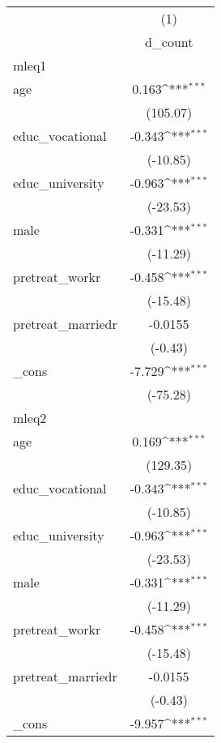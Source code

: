 {
\def\sym#1{\ifmmode^{#1}\else\(^{#1}\)\fi}
\begin{tabular}{l*{1}{c}}
\hline\hline
            &\multicolumn{1}{c}{(1)}\\
            &\multicolumn{1}{c}{d\_count}\\
\hline
mleq1       &                     \\
age         &       0.163\sym{***}\\
            &    (105.07)         \\
[1em]
educ\_vocational&      -0.343\sym{***}\\
            &    (-10.85)         \\
[1em]
educ\_university&      -0.963\sym{***}\\
            &    (-23.53)         \\
[1em]
male        &      -0.331\sym{***}\\
            &    (-11.29)         \\
[1em]
pretreat\_workr&      -0.458\sym{***}\\
            &    (-15.48)         \\
[1em]
pretreat\_marriedr&     -0.0155         \\
            &     (-0.43)         \\
[1em]
\_cons      &      -7.729\sym{***}\\
            &    (-75.28)         \\
\hline
mleq2       &                     \\
age         &       0.169\sym{***}\\
            &    (129.35)         \\
[1em]
educ\_vocational&      -0.343\sym{***}\\
            &    (-10.85)         \\
[1em]
educ\_university&      -0.963\sym{***}\\
            &    (-23.53)         \\
[1em]
male        &      -0.331\sym{***}\\
            &    (-11.29)         \\
[1em]
pretreat\_workr&      -0.458\sym{***}\\
            &    (-15.48)         \\
[1em]
pretreat\_marriedr&     -0.0155         \\
            &     (-0.43)         \\
[1em]
\_cons      &      -9.957\sym{***}\\

\end{tabular}}
